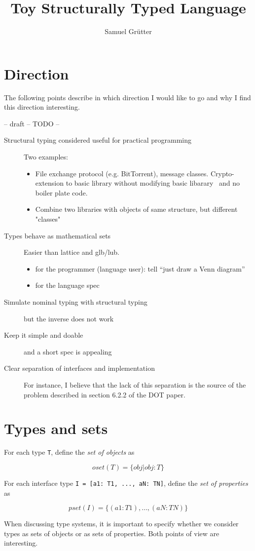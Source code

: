 \documentclass[12pt, draft]{article}
\title{Toy Structurally Typed Language}
\author{Samuel Gr\"utter}
\date{}
\begin{document}
\parindent=0pt

\section{Direction}

The following points describe in which direction I would like to go and why I 
find this direction interesting.

-- draft -- TODO --

\begin{description}

  \item[Structural typing considered useful for practical programming] 
  Two examples:
  \begin{itemize}
  \item File exchange protocol (e.g. BitTorrent), message classes. 
        Crypto-extension to basic library without modifying basic libarary \
        and no boiler plate code.
  \item Combine two libraries with objects of same structure, but different
        "classes"
  \end{itemize}
  
  \item[Types behave as mathematical sets] 
  Easier than lattice and glb/lub.
  \begin{itemize}
     \item for the programmer (language user): tell ``just draw a Venn diagram''
     \item for the language spec
  \end{itemize} 
  
  \item[Simulate nominal typing with structural typing] 
  but the inverse does not work
  
  \item[Keep it simple and doable] 
  and a short spec is appealing
  
  \item[Clear separation of interfaces and implementation] 
  For instance, I believe that the lack of this separation is the source 
  of the problem described in section 6.2.2 of the DOT paper.

\end{description}

\section{Types and sets}

For each type \lstinline!T!, define the \emph{set of objects} as

$$oset(T) = \{ obj | obj : T \}$$

For each interface type \lstinline!I = [a1: T1, ..., aN: TN]!, define the 
\emph{set of properties} as 

$$pset(I) = \{ (a1: T1), \dots , (aN: TN) \}$$

When discussing type systems, it is important to specify whether we consider
types as sets of objects or as sets of properties. Both points of view are
interesting.
\end{document}
